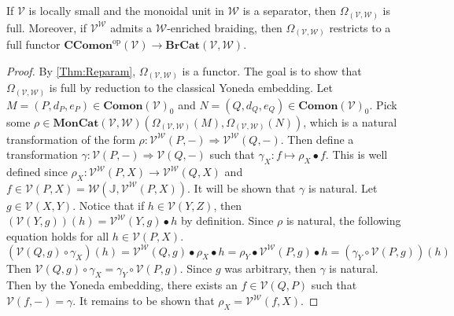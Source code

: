 \begin{cor}
    \label{Cor:FullFunctor}
    If $\mathcal{V}$ is locally small and the monoidal unit in $\mathcal{W}$ is a separator, then $\Omega_{(\mathcal{V}, \mathcal{W})}$ is full.
    Moreover, if $\mathcal{V}^{\mathcal{W}}$ admits a $\mathcal{W}$-enriched braiding, then $\Omega_{(\mathcal{V}, \mathcal{W})}$ restricts to a full functor $\mathbf{CComon}^{\text{op}}( \mathcal{V} ) \to \mathbf{BrCat}( \mathcal{V}, \mathcal{W} )$.
\end{cor}

\begin{proof}
    By \cref{Thm:Reparam}, $\Omega_{(\mathcal{V}, \mathcal{W})}$ is a functor.
    The goal is to show that $\Omega_{(\mathcal{V},\mathcal{W})}$ is full by reduction to the classical Yoneda embedding.
    Let $M = ( P, d_P, e_P ) \in \mathbf{Comon}( \mathcal{V} )_0$ and $N = ( Q, d_Q, e_Q ) \in \mathbf{Comon}( \mathcal{V} )_0$.
    Pick some $\rho \in \mathbf{MonCat}( \mathcal{V}, \mathcal{W} )\left( \Omega_{(\mathcal{V},\mathcal{W})}( M ), \Omega_{(\mathcal{V},\mathcal{W})}( N ) \right)$, which is a natural transformation of the form $\rho: \mathcal{V}^{\mathcal{W}}( P, - ) \Rightarrow \mathcal{V}^{\mathcal{W}}( Q, - )$.
    Then define a transformation $\gamma: \mathcal{V}( P, - ) \Rightarrow \mathcal{V}( Q, - )$ such that $\gamma_X: f \mapsto \rho_X \bullet f$.
    This is well defined since $\rho_X: \mathcal{V}^{\mathcal{W}}( P, X ) \to \mathcal{V}^{\mathcal{W}}( Q, X )$ and $f \in \mathcal{V}( P, X ) = \mathcal{W}( \mathbb{J}, \mathcal{V}^{\mathcal{W}}( P, X ) )$.
    It will be shown that $\gamma$ is natural.
    Let $g \in \mathcal{V}( X, Y )$.
    Notice that if $h \in \mathcal{V}( Y, Z )$, then $(\mathcal{V}( Y, g ))( h ) = \mathcal{V}^{\mathcal{W}}( Y, g ) \bullet h$ by definition.
    Since $\rho$ is natural, the following equation holds for all $h \in \mathcal{V}( P, X )$.
    \begin{equation*}
        ( \mathcal{V}( Q, g ) \circ \gamma_X )( h )
        =
        \mathcal{V}^{\mathcal{W}}( Q, g ) \bullet \rho_X \bullet h
        =
        \rho_Y \bullet \mathcal{V}^{\mathcal{W}}( P, g ) \bullet h
        =
        ( \gamma_Y \circ \mathcal{V}( P, g ) )( h )
    \end{equation*}
    Then $\mathcal{V}( Q, g ) \circ \gamma_X = \gamma_Y \circ \mathcal{V}( P, g )$.
    Since $g$ was arbitrary, then $\gamma$ is natural.
    Then by the Yoneda embedding, there exists an $f \in \mathcal{V}( Q, P )$ such that $\mathcal{V}( f, - ) = \gamma$.
    It remains to be shown that $\rho_X = \mathcal{V}^{\mathcal{W}}( f, X )$.

\end{proof}
